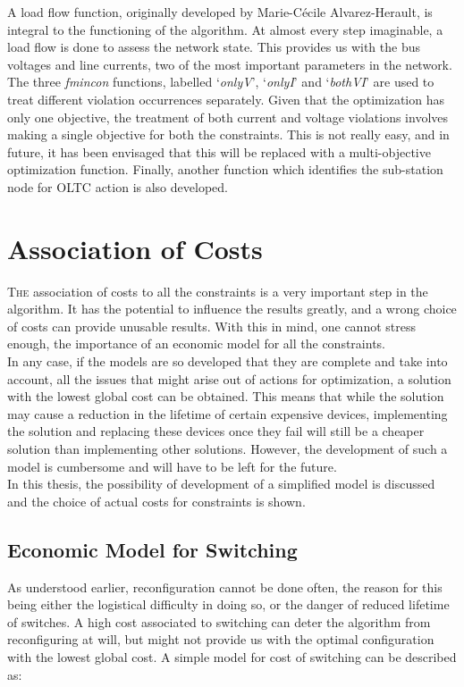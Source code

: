 A load flow function, originally developed by Marie-C\'{e}cile Alvarez-Herault, is integral to the functioning of the algorithm. At almost every step imaginable, a load flow is done to assess the network state. This provides us with the bus voltages and line currents, two of the most important parameters in the network.\\

The three \emph{fmincon} functions, labelled `\emph{onlyV}', `\emph{onlyI}' and `\emph{bothVI}' are used to treat different violation occurrences separately. Given that the optimization has only one objective, the treatment of both current and voltage violations involves making a single objective for both the constraints. This is not really easy, and in future, it has been envisaged that this will be replaced with a multi-objective optimization function. Finally, another function which identifies the sub-station node for OLTC action is also developed.

\section{Association of Costs}

\lettrine[nindent=0pt]{T}{he} association of costs to all the constraints is a very important step in the algorithm. It has the potential to influence the results greatly, and a wrong choice of costs can provide unusable results. With this in mind, one cannot stress enough, the importance of an economic model for all the constraints.\\

In any case, if the models are so developed that they are complete and take into account, all the issues that might arise out of actions for optimization, a solution with the lowest global cost can be obtained. This means that while the solution may cause a reduction in the lifetime of certain expensive devices, implementing the solution and replacing these devices once they fail will still be a cheaper solution than implementing other solutions. However, the development of such a model is cumbersome and will have to be left for the future.\\

In this thesis, the possibility of development of a simplified  model is discussed and the choice of actual costs for constraints is shown.

\subsection{Economic Model for Switching}
As understood earlier, reconfiguration cannot be done often, the reason for this being either the logistical difficulty in doing so, or the danger of reduced lifetime of switches. A high cost associated to switching can deter the algorithm from reconfiguring at will, but might not provide us with the optimal configuration with the lowest global cost. A simple model for cost of switching can be described as:

